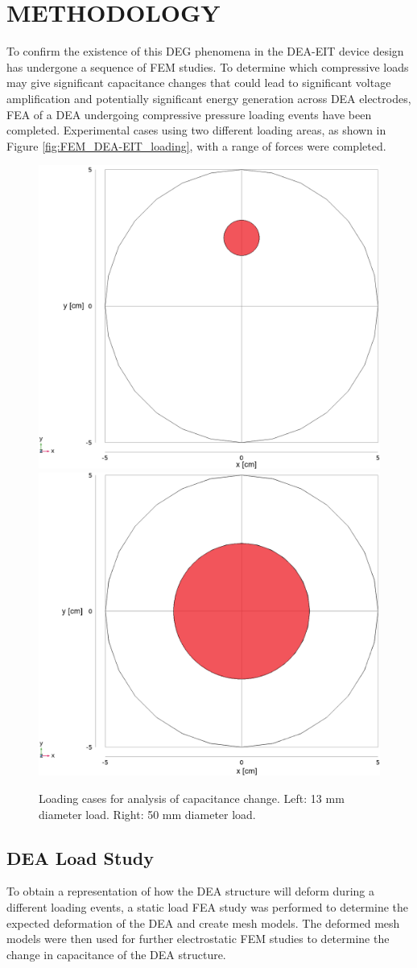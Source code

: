 \section{METHODOLOGY} %
\label{sec:method}
To confirm the existence of this DEG phenomena in the DEA-EIT device design has undergone a sequence of FEM studies. To determine which compressive loads may give significant capacitance changes that could lead to significant voltage amplification and potentially significant energy generation across DEA electrodes, FEA of a DEA undergoing compressive pressure loading events have been completed. Experimental cases using two different loading areas, as shown in Figure \ref{fig:FEM_DEA-EIT_loading}, with a range of forces were completed. 
\begin{figure}[H]
	\centering
	\includegraphics[width=0.45\linewidth]{Figures/d13mm_load_case_comsol2d_red.png} %
	\includegraphics[width=0.45\linewidth]{Figures/d50mm_load_case_comsol2d_red.png} %
	\vspace{0.3cm}
	\caption{Loading cases for analysis of capacitance change. Left: 13 mm diameter load. Right: 50 mm diameter load.}
	\label{fig:DEA-EIT_loading}
\end{figure}


\subsection{DEA Load Study}
To obtain a representation of how the DEA structure will deform during a different loading events, a static load FEA study was performed to determine the expected deformation of the DEA and create mesh models. The deformed mesh models were then used for further electrostatic FEM studies to determine the change in capacitance of the DEA structure.

